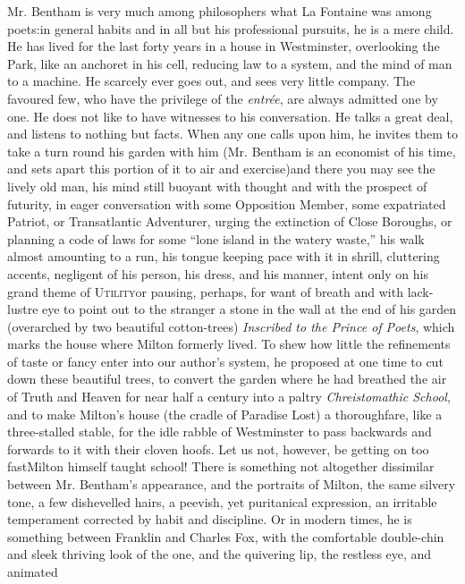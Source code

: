Mr. Bentham is very much among philosophers what La Fontaine was
among poets:\textemdash in general habits and in all but his
professional pursuits, he is a mere child. He has lived for the
last forty years in a house in Westminster, overlooking the Park,
like an anchoret in his cell, reducing law to a system, and the
mind of man to a machine. He scarcely ever goes out, and sees very
little company. The favoured few, who have the privilege of the
\emph{entr\'{e}e}, are always admitted one by one. He does not
like to have witnesses to his conversation. He talks a great deal,
and listens to nothing but facts. When any one calls upon him, he
invites them to take a turn round his garden with him (Mr. Bentham
is an economist of his time, and sets apart this portion of it to
air and exercise)\textemdash and there you may see the lively old
man, his mind still buoyant with thought and with the prospect of
futurity, in eager conversation with some Opposition Member, some
expatriated Patriot, or Transatlantic Adventurer, urging the
extinction of Close Boroughs, or planning a code of laws for some
``lone island in the watery waste,'' his walk almost amounting to
a run, his tongue keeping pace with it in shrill, cluttering
accents, negligent of his person, his dress, and his manner,
intent only on his grand theme of \textsc{Utility}\textemdash or pausing,
perhaps, for want of breath and with lack-lustre eye to point out
to the stranger a stone in the wall at the end of his garden
(overarched by two beautiful cotton-trees) \emph{Inscribed to the
Prince of Poets}, which marks the house where Milton formerly
lived. To shew how little the refinements of taste or fancy enter
into our author's system, he proposed at one time to cut down
these beautiful trees, to convert the garden where he had breathed
the air of Truth and Heaven for near half a century into a paltry
\emph{Chreistomathic School}, and to make Milton's house (the
cradle of Paradise Lost) a thoroughfare, like a three-stalled
stable, for the idle rabble of Westminster to pass backwards and
forwards to it with their cloven hoofs. Let us not, however, be
getting on too fast\textemdash Milton himself taught school! There
is something not altogether dissimilar between Mr. Bentham's
appearance, and the portraits of Milton, the same silvery tone, a
few dishevelled hairs, a peevish, yet puritanical expression, an
irritable temperament corrected by habit and discipline. Or in
modern times, he is something between Franklin and Charles Fox,
with the comfortable double-chin and sleek thriving look of the
one, and the quivering lip, the restless eye, and animated
